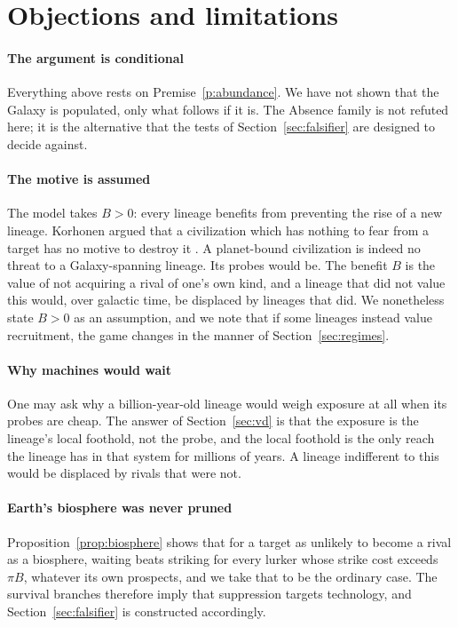 \documentclass[preprint,12pt]{elsarticle}
\theoremstyle{definition}
\begin{document}
\section{Objections and limitations}
\label{sec:objections}

\paragraph{The argument is conditional}
Everything above rests on Premise~\ref{p:abundance}. We have not shown that the Galaxy is populated, only what follows if it is. The Absence family is not refuted here; it is the alternative that the tests of Section~\ref{sec:falsifier} are designed to decide against.

\paragraph{The motive is assumed}
The model takes $B > 0$: every lineage benefits from preventing the rise of a new lineage. Korhonen argued that a civilization which has nothing to fear from a target has no motive to destroy it \citep{Korhonen2013}. A planet-bound civilization is indeed no threat to a Galaxy-spanning lineage. Its probes would be. The benefit $B$ is the value of not acquiring a rival of one's own kind, and a lineage that did not value this would, over galactic time, be displaced by lineages that did. We nonetheless state $B > 0$ as an assumption, and we note that if some lineages instead value recruitment, the game changes in the manner of Section~\ref{sec:regimes}.

\paragraph{Why machines would wait}
One may ask why a billion-year-old lineage would weigh exposure at all when its probes are cheap. The answer of Section~\ref{sec:vd} is that the exposure is the lineage's local foothold, not the probe, and the local foothold is the only reach the lineage has in that system for millions of years. A lineage indifferent to this would be displaced by rivals that were not.

\paragraph{Earth's biosphere was never pruned}
Proposition~\ref{prop:biosphere} shows that for a target as unlikely to become a rival as a biosphere, waiting beats striking for every lurker whose strike cost exceeds $\pi B$, whatever its own prospects, and we take that to be the ordinary case. The survival branches therefore imply that suppression targets technology, and Section~\ref{sec:falsifier} is constructed accordingly.
\end{document}
